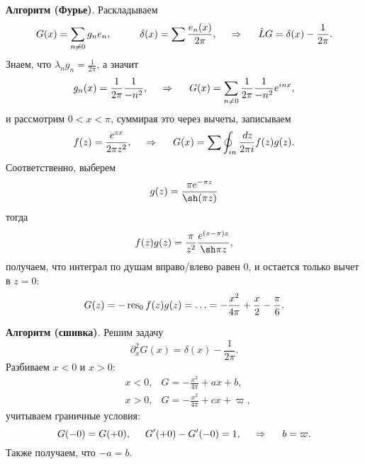 \textbf{Алгоритм (Фурье)}. Раскладываем 
\begin{equation*}
    G(x) = \sum_{n \neq 0} g_n e_n,
    \hspace{10 mm} 
    \delta(x) = \sum \frac{e_n (x)}{2 \pi},
    \hspace{0.5cm} \Rightarrow \hspace{0.5cm}
    \hat{L} G = \delta(x) - \frac{1}{2\pi}.
\end{equation*}
Знаем, что $\lambda_n g_n = \frac{1}{2\pi}$, а значит
\begin{equation*}
    g_n(x) = \frac{1}{2\pi} \frac{1}{- n^2},
    \hspace{0.5cm} \Rightarrow \hspace{0.5cm}   
    G(x) = \sum_{n \neq 0} \frac{1}{2\pi} \frac{1}{-n^2} e^{i n x},
\end{equation*}
и рассмотрим $0 < x < \pi$, суммирая это через вычеты, записываем
\begin{equation*}
    f(z) = \frac{e^{zx}}{2 \pi z^2}, 
    \hspace{0.5cm} \Rightarrow \hspace{0.5cm}   
    G(x) = \sum \oint_{in} \frac{\, d z}{2 \pi i} f(z) g(z).
\end{equation*}
Соответственно, выберем
\begin{align*}
    g(z) = \frac{\pi e^{- \pi z}}{\sh (\pi z)}
\end{align*}
тогда
\begin{equation*}
    f(z) g(z) = \frac{\pi}{z^2} \frac{e^{(x-\pi)z}}{\sh \pi z},
\end{equation*}
получаем, что интеграл по душам вправо/влево  равен $0$, и остается только вычет в $z = 0$:
\begin{equation*}
    G(z) = - \mathop{\mathrm{res}}\nolimits_0 f(z) g(z) = \ldots = - \frac{x^2}{4 \pi} + \frac{x}{2} - \frac{\pi}{6}.
\end{equation*}



\textbf{Алгоритм (сшивка)}. Решим задачу
\begin{equation*}
    \partial_x^2 G(x) = \delta(x) - \frac{1}{2\pi}.
\end{equation*}
Разбиваем $x < 0$ и $x > 0$:
\begin{align*}
    &x < 0, 
    & G = -\tfrac{x^2}{4 \pi} + a x + b, \\
    &x > 0, 
    & G = -\tfrac{x^2}{4 \pi} + c x + \varpi, 
\end{align*}
учитываем граничные условия:
\begin{equation*}
    G(-0) = G(+0),
    \hspace{5 mm} 
    G'(+0) - G'(-0) = 1,
    \hspace{0.5cm} \Rightarrow \hspace{0.5cm}   
    b = \varpi.
\end{equation*}
Также получаем, что $-a = b$.

